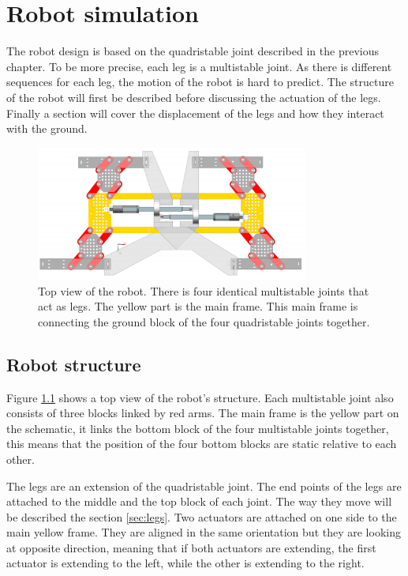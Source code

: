 \chapter{Robot simulation}
    The robot design is based on the quadristable joint described in the previous chapter. To be more precise, each leg is a multistable joint. As there is different sequences for each leg, the motion of the robot is hard to predict. The structure of the robot will first be described before discussing the actuation of the legs. Finally a section will cover the displacement of the legs and how they interact with the ground.
    
    \begin{figure}[h!]
        \centering
        \includegraphics[width=0.8\textwidth]{images/top_view_robot.png}
        \caption{Top view of the robot. There is four identical multistable joints that act as legs. The yellow part is the main frame. This main frame is connecting the ground block of the four quadristable joints together. }
        \label{fig:robot_top_view}
    \end{figure}
    
    \section{Robot structure}
        Figure \ref{fig:robot_top_view} shows a top view of the robot's structure. Each multistable joint also consists of three blocks linked by red arms. The main frame is the yellow part on the schematic, it links the bottom block of the four multistable joints together, this means that the position of the four bottom blocks are static relative to each other. 
        
        
        The legs are an extension of the quadristable joint. The end points of the legs are attached to the middle and the top block of each joint. The way they move will be described the section \ref{sec:legs}. Two actuators are attached on one side to the main yellow frame. They are aligned in the same orientation but they are looking at opposite direction, meaning that if both actuators are extending, the first actuator is extending to the left, while the other is extending to the right.
        
